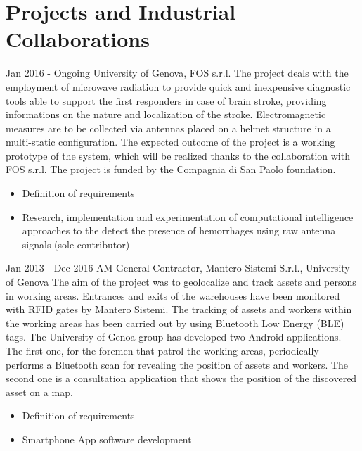 \section{Projects and Industrial Collaborations}
{Jan 2016 - Ongoing}
{University of Genova, FOS s.r.l.}
{ The project deals with the employment of microwave radiation to provide quick and inexpensive diagnostic tools able to support the first responders in case of brain stroke, providing informations on the nature and localization of the stroke. Electromagnetic measures are to be collected via antennas placed on a helmet structure in a multi-static configuration. The expected outcome of the project is a working prototype of the system, which will be realized thanks to the collaboration with FOS s.r.l.
The project is funded by the Compagnia di San Paolo foundation.
}

{
\begin{itemize}[noitemsep,topsep=0pt,parsep=0pt,partopsep=0pt]
\item Definition of requirements
\item Research, implementation and experimentation of computational intelligence approaches to the detect the presence of hemorrhages using raw antenna signals (sole contributor)
\end{itemize}
} 



{Jan 2013 - Dec 2016}
{AM General Contractor, Mantero Sistemi S.r.l., University of Genova}
{The aim of the project was to geolocalize and track assets and persons in working areas. Entrances and exits of the warehouses have been monitored with RFID gates by Mantero Sistemi. The tracking of assets and workers within the working areas has been carried out by using Bluetooth Low Energy (BLE) tags. The University of Genoa group has developed two Android applications. The first one, for the foremen that patrol the working areas, periodically performs a Bluetooth scan for revealing the position of assets and workers. The second one is a consultation application that shows the position of the discovered asset on a map.}
{
\begin{itemize}[noitemsep,topsep=0pt,parsep=0pt,partopsep=0pt]
\item Definition of requirements
\item Smartphone App software development
\end{itemize}
} 

